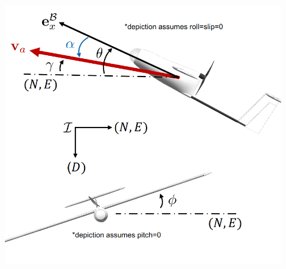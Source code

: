 \documentclass[landscape,a0paper,fontscale=0.285]{baposter} %
\begin{document}
\begin{poster}
{\centering
\includegraphics[width=0.9\textwidth]{images/fixed_wing_front_side_view.png}



}





\end{poster}
\newpage
\end{document}
